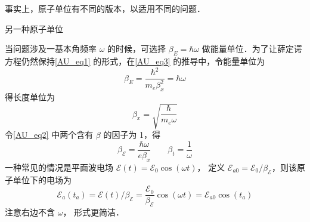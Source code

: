 事实上，原子单位有不同的版本，以适用不同的问题．

\begin{exam}{另一种原子单位}

当问题涉及一基本角频率 $\omega$ 的时候，可选择 $\beta_E = \hbar\omega$ 做能量单位．为了让薛定谔方程仍然保持\autoref{AU_eq1} 的形式，在\autoref{AU_eq3} 的推导中，令能量单位为
\begin{equation}
\beta_E = \frac{\hbar^2}{m_e\beta_x^2}=\hbar\omega
\end{equation}
得长度单位为
\begin{equation}
\beta_x = \sqrt{\frac{\hbar}{m_e\omega}}
\end{equation}
令\autoref{AU_eq2} 中两个含有 $\beta$ 的因子为 1，得
\begin{equation}
\beta_\mathcal{E} = \frac{\hbar\omega}{e \beta_x} \qquad \beta_t = \frac{1}{\omega}
\end{equation}
一种常见的情况是平面波电场 $\mathcal{E}(t) = \mathcal{E}_0\cos(\omega t)$， 定义 $\mathcal{E}_{a0} = \mathcal{E}_0/\beta_\mathcal{E}$，则该原子单位下的电场为
\begin{equation}
\mathcal{E}_a(t_a) = \mathcal{E}(t)/\beta_\mathcal{E} =
\frac{\mathcal{E}_{0}}{\beta_\mathcal{E}}\cos(\omega t) = \mathcal{E}_{a0}\cos(t_a)
\end{equation}
注意右边不含 $\omega$， 形式更简洁．
\end{exam}



